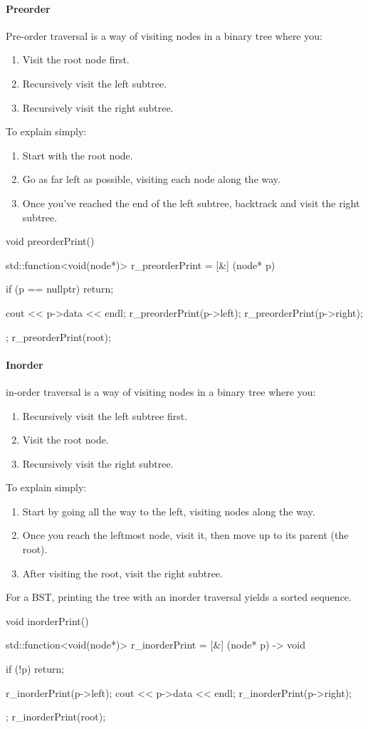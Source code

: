 \documentclass{report}
\begin{document}
\paragraph{Preorder}
\bigbreak \noindent \bigbreak \noindent 
Pre-order traversal is a way of visiting nodes in a binary tree where you:
\begin{enumerate}
    \item Visit the root node first.
    \item Recursively visit the left subtree.
    \item Recursively visit the right subtree.
\end{enumerate}
To explain simply:
\begin{enumerate}
    \item Start with the root node.
    \item Go as far left as possible, visiting each node along the way.
    \item Once you've reached the end of the left subtree, backtrack and visit the right subtree.
\end{enumerate}
\bigbreak \noindent 
\begin{cppcode}
    void preorderPrint() {
        std::function<void(node*)> r_preorderPrint = [&] (node* p) {
            if (p == nullptr) return;

            cout << p->data << endl;
            r_preorderPrint(p->left);
            r_preorderPrint(p->right);
        };
        r_preorderPrint(root);
    }
\end{cppcode}

\bigbreak \noindent 
\paragraph{Inorder}
\bigbreak \noindent\bigbreak \noindent  
in-order traversal is a way of visiting nodes in a binary tree where you:
\begin{enumerate}
    \item Recursively visit the left subtree first.
    \item Visit the root node.
    \item Recursively visit the right subtree.
\end{enumerate}
To explain simply:
\begin{enumerate}
    \item Start by going all the way to the left, visiting nodes along the way.
    \item Once you reach the leftmost node, visit it, then move up to its parent (the root).
    \item After visiting the root, visit the right subtree.
\end{enumerate}
\bigbreak \noindent 
For a BST, printing the tree with an inorder traversal yields a sorted sequence.
\bigbreak \noindent 
\begin{cppcode}
    void inorderPrint() {
        std::function<void(node*)> r_inorderPrint = [&] (node* p) -> void {
            if (!p) return;

            r_inorderPrint(p->left);
            cout << p->data << endl;
            r_inorderPrint(p->right);
        };
        r_inorderPrint(root);
    }
\end{cppcode}
\end{document}

